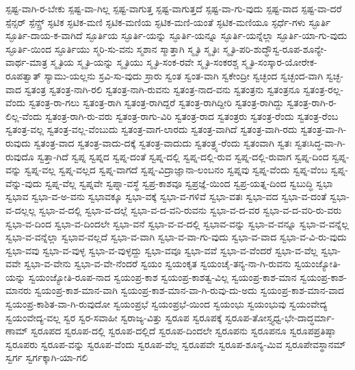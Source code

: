 {ಸ್ಪಷ್ಟ-ವಾಗಿ-ರ-ಬೇಕು
ಸ್ಪಷ್ಟ-ವಾ-ಗಿಲ್ಲ
ಸ್ಪಷ್ಟ-ವಾಗುತ್ತ
ಸ್ಪಷ್ಟ-ವಾಗುತ್ತದೆ
ಸ್ಪಷ್ಟ-ವಾ-ಗು-ವುದು
ಸ್ಪಷ್ಟ-ವಾದ
ಸ್ಪಷ್ಟ-ವಾ-ದರೆ
ಸ್ಪೆನ್ಸರ್
ಸ್ಪೆನ್ಸ್ರ್
ಸ್ಫಟಿಕ
ಸ್ಫಟಿಕ-ಮಣಿ
ಸ್ಫಟಿಕ-ಮಣಿಯ
ಸ್ಫಟಿಕ-ಮಣಿ-ಯಂತೆ
ಸ್ಫಟಿಕ-ಮಣಿಯೂ
ಸ್ಫರ್ಧೆ-ಗಳು
ಸ್ಫೂರ್ತಿ
ಸ್ಫೂರ್ತಿ-ದಾಯ-ಕ-ವಾಗಿದೆ
ಸ್ಫೂರ್ತಿಯ
ಸ್ಫೂರ್ತಿ-ಯನ್ನು
ಸ್ಫೂರ್ತಿ-ಯನ್ನೂ
ಸ್ಫೂರ್ತಿ-ಯನ್ನೆಲ್ಲಾ
ಸ್ಫೂರ್ತಿ-ಯಾ-ಗು-ವುದು
ಸ್ಫೂರ್ತಿ-ಯಿಂದ
ಸ್ಫೂರ್ತಿಯು
ಸ್ಮರಿ-ಸು-ವನು
ಸ್ಮಶಾನ
ಸ್ಮಾತ್ತಾಗಿ
ಸ್ಮೃತಿ
ಸ್ಮೃತಿಃ
ಸ್ಮೃತಿ-ಪರಿ-ಶುದ್ಧೌಸ್ವ-ರೂಪ-ಶೂನ್ಯೇ-ವಾರ್ಥ-ಮಾತ್ರ
ಸ್ಮೃತಿಯ
ಸ್ಮೃತಿ-ಯನ್ನು
ಸ್ಮೃತಿಯು
ಸ್ಮೃತಿ-ಸಂಕ-ರವೇ
ಸ್ಮೃತಿ-ಸಂಕರಶ್ಚ
ಸ್ಮೃತಿ-ಸಂಸ್ಕಾರ-ಯೋರೇಕ-ರೂಪತ್ವಾತ್
ಸ್ಯಾಮು-ಯಲ್ಲನು
ಸ್ರವಿ-ಸು-ವುದು
ಸ್ರಾರು
ಸ್ವಂತ
ಸ್ವಂತ-ವಾಗಿ
ಸ್ವಕೇಂದ್ರೀ
ಸ್ವಚ್ಛಂದ
ಸ್ವಚ್ಛಂದ-ವಾಗಿ
ಸ್ವಚ್ಛ-ವಾದ
ಸ್ವತಂತ್ರ
ಸ್ವತಂತ್ರ-ನಾಗಿ-ರಲಿ
ಸ್ವತಂತ್ರ-ನಾಗಿ-ರುವನು
ಸ್ವತಂತ್ರ-ನಾದ-ವನು
ಸ್ವತಂತ್ರನು
ಸ್ವತಂತ್ರನೂ
ಸ್ವತಂತ್ರ-ರಲ್ಲ-ವೆಂದು
ಸ್ವತಂತ್ರ-ರಾ-ಗಲು
ಸ್ವತಂತ್ರ-ರಾಗಿ
ಸ್ವತಂತ್ರ-ರಾಗಿದ್ದರೆ
ಸ್ವತಂತ್ರ-ರಾಗಿದ್ದೀರಿ
ಸ್ವತಂತ್ರ-ರಾಗಿದ್ದು
ಸ್ವತಂತ್ರ-ರಾಗಿ-ರ-ಲಿಲ್ಲ-ವೆಂದು
ಸ್ವತಂತ್ರ-ರಾಗಿ-ರು-ವರು
ಸ್ವತಂತ್ರ-ರಾಗು-ವಿರಿ
ಸ್ವತಂತ್ರ-ರಾದ
ಸ್ವತಂತ್ರರು
ಸ್ವತಂತ್ರ-ರೆಂದು
ಸ್ವತಂತ್ರ-ರೆಂಬ
ಸ್ವತಂತ್ರ-ವಲ್ಲ
ಸ್ವತಂತ್ರ-ವಲ್ಲ-ವೆಂಬುದು
ಸ್ವತಂತ್ರ-ವಾಗ-ಲಾರದು
ಸ್ವತಂತ್ರ-ವಾಗಿದೆ
ಸ್ವತಂತ್ರ-ವಾಗಿ-ರದು
ಸ್ವತಂತ್ರ-ವಾ-ಗಿ-ರುವುದು
ಸ್ವತಂತ್ರ-ವಾದ
ಸ್ವತಂತ್ರ-ವಾದು-ದಕ್ಕೆ
ಸ್ವತಂತ್ರ-ವಾದುದು
ಸ್ವತಂತ್ರ್ಯ-ರೆಂದು
ಸ್ವತಂವಾಗಿ
ಸ್ವತಃ
ಸ್ವತಃಸಿದ್ಧ-ವಾ-ಗಿ-ರುವುದೊ
ಸ್ವತ್ತಾ-ಗಿದೆ
ಸ್ವಪ್ನ
ಸ್ವಪ್ನದ
ಸ್ವಪ್ನ-ದಂತೆ
ಸ್ವಪ್ನ-ದಲ್ಲಿ
ಸ್ವಪ್ನ-ದಲ್ಲಿ-ರುವ
ಸ್ವಪ್ನ-ದಲ್ಲಿ-ರುವಾಗ
ಸ್ವಪ್ನ-ದಿಂದ
ಸ್ವಪ್ನ-ವನ್ನು
ಸ್ವಪ್ನ-ವಲ್ಲ
ಸ್ವಪ್ನ-ವಲ್ಲದ
ಸ್ವಪ್ನ-ವಾಗದೆ
ಸ್ವಪ್ನ-ವಿದ್ರಾಜ್ಞಾನಾ-ಲಂಬನಂ
ಸ್ವಪ್ನವು
ಸ್ವಪ್ನ-ವೆಂದು
ಸ್ವಪ್ನ-ವೆಂಬ
ಸ್ವಪ್ನ-ವೆನ್ನು-ವುದು
ಸ್ವಪ್ನ-ವೆಲ್ಲ
ಸ್ವಪ್ನವೇ
ಸ್ವಪ್ನಾ-ವಸ್ಥೆ
ಸ್ವಪ್ರ-ಕಾಶವೂ
ಸ್ವಪ್ರಜ್ಞೆ-ಯಿಂದ
ಸ್ವಪ್ರ-ಯತ್ನ-ದಿಂದ
ಸ್ವಬುದ್ಧಿ
ಸ್ವಭಾ
ಸ್ವಭಾವ
ಸ್ವಭಾ-ವ-ಅ-ವನು
ಸ್ವಭಾವಕ್ಕೂ
ಸ್ವಭಾ-ವಕ್ಕೆ
ಸ್ವಭಾ-ವ-ಗಳಿವೆ
ಸ್ವಭಾ-ವತಃ
ಸ್ವಭಾ-ವದ
ಸ್ವಭಾ-ವ-ದಂತೆ
ಸ್ವಭಾ-ವ-ದಲ್ಲಲ್ಲ
ಸ್ವಭಾ-ವ-ದಲ್ಲಿ
ಸ್ವಭಾ-ವ-ದಲ್ಲೆ
ಸ್ವಭಾ-ವ-ದ-ವನಿ-ರುವನು
ಸ್ವಭಾ-ವ-ದ-ವರ
ಸ್ವಭಾ-ವ-ದ-ವರಿ-ರು-ವರು
ಸ್ವಭಾ-ವ-ದಿಂದ
ಸ್ವಭಾ-ವ-ದಿಂದಲೇ
ಸ್ವಭಾ-ವನೆ
ಸ್ವಭಾ-ವ-ವ-ದಲ್ಲಿ
ಸ್ವಭಾವ-ವನ್ನು
ಸ್ವಭಾ-ವ-ವನ್ನೂ
ಸ್ವಭಾ-ವ-ವನ್ನೆಲ್ಲ
ಸ್ವಭಾ-ವ-ವನ್ನೆಲ್ಲಾ
ಸ್ವಭಾವ-ವಲ್ಲದೆ
ಸ್ವಭಾ-ವ-ವಾಗಿ
ಸ್ವಭಾ-ವ-ವಾ-ಗು-ವುದು
ಸ್ವಭಾ-ವ-ವಾದ
ಸ್ವಭಾ-ವ-ವಿ-ರು-ವುದು
ಸ್ವಭಾ-ವವು
ಸ್ವಭಾ-ವ-ವುಳ್ಳ
ಸ್ವಭಾ-ವ-ವುಳ್ಳದ್ದು
ಸ್ವಭಾ-ವವೂ
ಸ್ವಭಾ-ವವೆ
ಸ್ವಭಾ-ವ-ವೆಂದರೆ
ಸ್ವಭಾ-ವ-ವೆಲ್ಲ
ಸ್ವಭಾ-ವವೇ
ಸ್ವಭಾ-ವ-ವೇನು
ಸ್ವಭಾ-ವ-ವೇ-ನೆಂದರೆ
ಸ್ವಯಂ
ಸ್ವಯಂಕೃತ
ಸ್ವಯಂಚೈ-ತನ್ಯ-ನಾ-ಗಿ-ರುವನು
ಸ್ವಯಂಜ್ಯೋತಿ-ಯನ್ನು
ಸ್ವಯಂಜ್ಯೋತಿ-ರೂಪ-ನಾದ
ಸ್ವಯಂಪ್ರ-ಕಾಶ
ಸ್ವಯಂಪ್ರ-ಕಾಶತ್ವ-ವಿಲ್ಲ
ಸ್ವಯಂಪ್ರ-ಕಾಶ-ಮಾನ
ಸ್ವಯಂಪ್ರ-ಕಾಶ-ಮಾನರು
ಸ್ವಯಂಪ್ರ-ಕಾಶ-ಮಾನ-ವಾಗಿ
ಸ್ವಯಂಪ್ರ-ಕಾಶ-ಮಾನ-ವಾ-ಗಿ-ರುವು-ದು-ಅದು
ಸ್ವಯಂಪ್ರ-ಕಾಶ-ಮಾನ-ವಾದ
ಸ್ವಯಂಪ್ರ-ಕಾಶಿತ-ವಾ-ಗಿ-ರುವುದೋ
ಸ್ವಯಂಪ್ರಭೆ
ಸ್ವಯಂಪ್ರಭೆ-ಯಿಂದ
ಸ್ವಯಂಭು
ಸ್ವಯಂಭುವು
ಸ್ವಯಂವೇದ್ಯ
ಸ್ವಯಂವೇದ್ಯ-ವಲ್ಲ
ಸ್ವರ
ಸ್ವರ-ಸವಾಹೀ
ಸ್ವರಾಜ್ಯ-ವಿತ್ತು
ಸ್ವರೂಪ
ಸ್ವರೂಪಕ್ಕೆ
ಸ್ವರೂಪ-ತೋಸ್ತ್ಯಧ್ವ-ಭೇ-ದಾದ್ಧರ್ಮಾ-ಣಾಮ್
ಸ್ವರೂಪದ
ಸ್ವರೂಪ-ದಲ್ಲಿ
ಸ್ವರೂಪ-ದಲ್ಲಿದೆ
ಸ್ವರೂಪ-ದಿಂದಲೇ
ಸ್ವರೂಪನು
ಸ್ವರೂಪನೂ
ಸ್ವರೂಪಪ್ರತಿಷ್ಠಾ
ಸ್ವರೂಪರು
ಸ್ವರೂಪ-ವನ್ನು
ಸ್ವರೂಪ-ವೆಂದು
ಸ್ವರೂಪ-ವೆಲ್ಲ
ಸ್ವರೂಪವೇ
ಸ್ವರೂಪ-ಶೂನ್ಯ-ಮಿವ
ಸ್ವರೂಪೇವಸ್ಥಾನಮ್
ಸ್ವರ್ಗ
ಸ್ವರ್ಗಕ್ಕಾಗಿ-ಯಾ-ಗಲಿ
}
